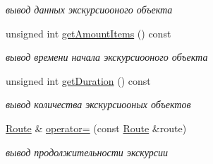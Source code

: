 \begin{DoxyCompactItemize}
\begin{DoxyCompactList}\small\item\em вывод данных экскурсиооного объекта \end{DoxyCompactList}\item 
\hypertarget{class_route_ab9bea74aecfe030ca9a0f50bb49c3e51}{}unsigned int \hyperlink{class_route_ab9bea74aecfe030ca9a0f50bb49c3e51}{get\+Amount\+Items} () const \label{class_route_ab9bea74aecfe030ca9a0f50bb49c3e51}

\begin{DoxyCompactList}\small\item\em вывод времени начала экскурсиооного объекта \end{DoxyCompactList}\item 
\hypertarget{class_route_a11f4c59d213f85f0608f6ef33cef50c4}{}unsigned int \hyperlink{class_route_a11f4c59d213f85f0608f6ef33cef50c4}{get\+Duration} () const \label{class_route_a11f4c59d213f85f0608f6ef33cef50c4}

\begin{DoxyCompactList}\small\item\em вывод количества экскурсиооных объектов \end{DoxyCompactList}\item 
\hypertarget{class_route_a2687322060916cafbd3f5c848a0512ba}{}\hyperlink{class_route}{Route} \& \hyperlink{class_route_a2687322060916cafbd3f5c848a0512ba}{operator=} (const \hyperlink{class_route}{Route} \&route)\label{class_route_a2687322060916cafbd3f5c848a0512ba}

\begin{DoxyCompactList}\small\item\em вывод продолжительности экскурсии \end{DoxyCompactList}\end{DoxyCompactItemize}
